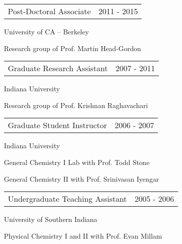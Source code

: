 \documentclass[10pt]{article}
\newenvironment{innerlist}[1][\enskip\textbullet]%
        {\begin{compactitem}[#1]}{\end{compactitem}}
\begin{document}
\vspace{-8pt}
\begin{tabular}{p{240pt} l}
Post-Doctoral Associate  & 2011 - 2015
\end{tabular}
\begin{innerlist}
\item[\hspace*{20pt}] University of CA -- Berkeley
\item[\hspace*{20pt}] Research group of Prof. Martin Head-Gordon\\
\end{innerlist}

\vspace{-8pt}

\begin{tabular}{p{240pt} l}
Graduate Research Assistant  & 2007 - 2011
\end{tabular}
\begin{innerlist}
\item[\hspace*{20pt}] Indiana University
\item[\hspace*{20pt}] Research group of Prof. Krishnan Raghavachari\\
\end{innerlist}

\vspace{-8pt}

\begin{tabular}{p{240pt} l}
Graduate Student Instructor  & 2006 - 2007
\end{tabular}
\begin{innerlist}
\item[\hspace*{20pt}] Indiana University
\item[\hspace*{20pt}] General Chemistry I Lab with Prof. Todd Stone
\item[\hspace*{20pt}] General Chemistry II with Prof. Srinivasan Iyengar\\
\end{innerlist}
%
\vspace{-8pt}

\begin{tabular}{p{240pt} l}
Undergraduate Teaching Assistant  & 2005 - 2006
\end{tabular}
\begin{innerlist}
\item[\hspace*{20pt}] University of Southern Indiana
\item[\hspace*{20pt}] Physical Chemistry I and II with Prof. Evan Millam\\
\end{innerlist}
%
\vspace{-8pt}
\end{document}

